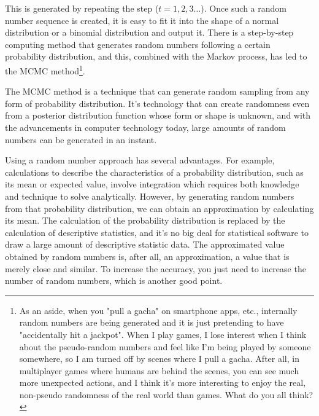 \documentclass{ltjsbook}
\begin{document}
This is generated by repeating the step ($t=1,2,3\ldots$). Once such a random number sequence is created, it is easy to fit it into the shape of a normal distribution or a binomial distribution and output it. There is a step-by-step computing method that generates random numbers following a certain probability distribution, and this, combined with the Markov process, has led to the MCMC method\footnote{As an aside, when you "pull a gacha" on smartphone apps, etc., internally random numbers are being generated and it is just pretending to have "accidentally hit a jackpot". When I play games, I lose interest when I think about the pseudo-random numbers and feel like I'm being played by someone somewhere, so I am turned off by scenes where I pull a gacha. After all, in multiplayer games where humans are behind the scenes, you can see much more unexpected actions, and I think it's more interesting to enjoy the real, non-pseudo randomness of the real world than games. What do you all think?}.


The MCMC method is a technique that can generate random sampling from any form of probability distribution. It's technology that can create randomness even from a posterior distribution function whose form or shape is unknown, and with the advancements in computer technology today, large amounts of random numbers can be generated in an instant.

Using a random number approach has several advantages. For example, calculations to describe the characteristics of a probability distribution, such as its mean or expected value, involve integration which requires both knowledge and technique to solve analytically. However, by generating random numbers from that probability distribution, we can obtain an approximation by calculating its mean. The calculation of the probability distribution is replaced by the calculation of descriptive statistics, and it's no big deal for statistical software to draw a large amount of descriptive statistic data. The approximated value obtained by random numbers is, after all, an approximation, a value that is merely close and similar. To increase the accuracy, you just need to increase the number of random numbers, which is another good point.
\end{document}
